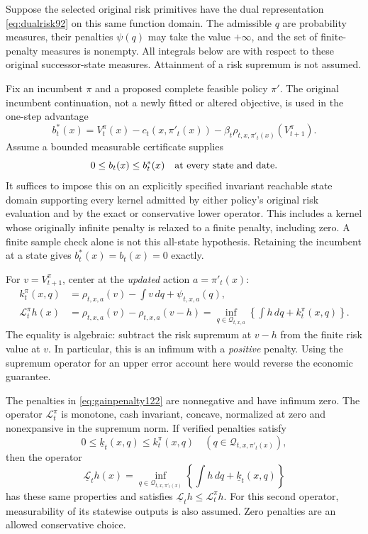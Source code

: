 Suppose the selected original risk primitives have the dual representation
\eqref{eq:dualrisk92} on this same function domain. The admissible $q$ are
probability measures, their penalties $\psi(q)$ may take the value $+\infty$,
and the set of finite-penalty measures is nonempty. All integrals below are
with respect to these original successor-state measures. Attainment of a
risk supremum is not assumed.

Fix an incumbent $\pi$ and a proposed complete feasible policy $\pi'$.
The original incumbent continuation, not a newly fitted or altered
objective, is used in the one-step advantage
\begin{equation}\label{eq:incumbentadvantage122}
 b_t^*(x)=V_t^\pi(x)-c_t(x,\pi'_t(x))
       -\beta_t\rho_{t,x,\pi'_t(x)}(V_{t+1}^\pi).
\end{equation}
Assume a bounded measurable certificate supplies
\begin{equation}\label{eq:advantagelower122}
                 0\le b_t(x)\le b_t^*(x)
                 \quad\hbox{at every state and date.}
\end{equation}
It suffices to impose this on an explicitly specified invariant reachable
state domain supporting every kernel admitted by either policy's original
risk evaluation and by the exact or conservative lower operator. This
includes a kernel whose originally infinite penalty is relaxed to a finite
penalty, including zero. A finite sample check alone is not this all-state
hypothesis. Retaining the incumbent
at a state gives $b_t^*(x)=b_t(x)=0$ exactly.

For $v=V_{t+1}^\pi$, center at the \emph{updated} action $a=\pi'_t(x)$:
\begin{align}
 k_t^\pi(x,q)
  &=\rho_{t,x,a}(v)-\int v\,dq+\psi_{t,x,a}(q),\label{eq:gainpenalty122}\\
 \mathcal L_t^\pi h(x)
  &=\rho_{t,x,a}(v)-\rho_{t,x,a}(v-h)
    =\inf_{q\in\mathcal Q_{t,x,a}}
           \left\{\int h\,dq+k_t^\pi(x,q)\right\}.
       \label{eq:lowercenter122}
\end{align}
The equality is algebraic: subtract the risk supremum at $v-h$ from the
finite risk value at $v$. In particular, this is an infimum with a
\emph{positive} penalty. Using the supremum operator for an upper error
account here would reverse the economic guarantee.

\begin{lemma}
\label{lem:lowercenter122}
The penalties in \eqref{eq:gainpenalty122} are nonnegative and have
infimum zero. The operator $\mathcal L_t^\pi$ is monotone, cash invariant,
concave, normalized at zero and nonexpansive in the supremum norm.
If verified penalties satisfy
\[
        0\le\underline k_t(x,q)\le k_t^\pi(x,q)
                    \quad(q\in\mathcal Q_{t,x,\pi'_t(x)}),
\]
then the operator
\[
 \underline{\mathcal L}_t h(x)
   =\inf_{q\in\mathcal Q_{t,x,\pi'_t(x)}}
            \left\{\int h\,dq+\underline k_t(x,q)\right\}
\]
has these same properties and satisfies
$\underline{\mathcal L}_t h\le\mathcal L_t^\pi h$.
For this second operator, measurability of its statewise outputs is also
assumed. Zero penalties are an allowed conservative choice.
\end{lemma}


